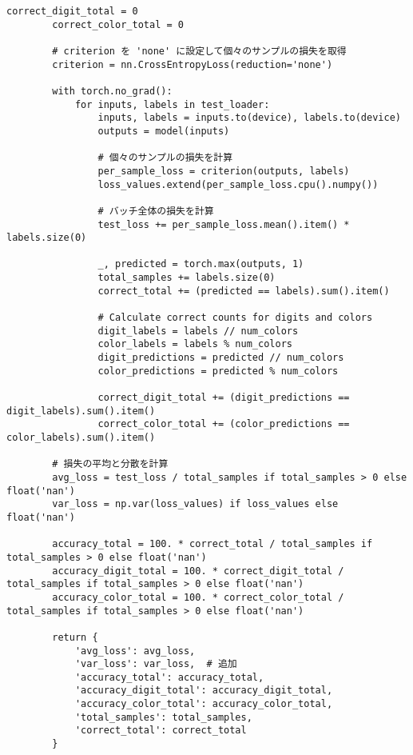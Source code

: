 \begin{lstlisting}[style=pythonstyle, caption={メインコード}]
        correct_digit_total = 0
        correct_color_total = 0
    
        # criterion を 'none' に設定して個々のサンプルの損失を取得
        criterion = nn.CrossEntropyLoss(reduction='none')
    
        with torch.no_grad():
            for inputs, labels in test_loader:
                inputs, labels = inputs.to(device), labels.to(device)
                outputs = model(inputs)
                
                # 個々のサンプルの損失を計算
                per_sample_loss = criterion(outputs, labels)
                loss_values.extend(per_sample_loss.cpu().numpy())
                
                # バッチ全体の損失を計算
                test_loss += per_sample_loss.mean().item() * labels.size(0)
                
                _, predicted = torch.max(outputs, 1)
                total_samples += labels.size(0)
                correct_total += (predicted == labels).sum().item()
    
                # Calculate correct counts for digits and colors
                digit_labels = labels // num_colors
                color_labels = labels % num_colors
                digit_predictions = predicted // num_colors
                color_predictions = predicted % num_colors
    
                correct_digit_total += (digit_predictions == digit_labels).sum().item()
                correct_color_total += (color_predictions == color_labels).sum().item()
    
        # 損失の平均と分散を計算
        avg_loss = test_loss / total_samples if total_samples > 0 else float('nan')
        var_loss = np.var(loss_values) if loss_values else float('nan')
        
        accuracy_total = 100. * correct_total / total_samples if total_samples > 0 else float('nan')
        accuracy_digit_total = 100. * correct_digit_total / total_samples if total_samples > 0 else float('nan')
        accuracy_color_total = 100. * correct_color_total / total_samples if total_samples > 0 else float('nan')
    
        return {
            'avg_loss': avg_loss,
            'var_loss': var_loss,  # 追加
            'accuracy_total': accuracy_total,
            'accuracy_digit_total': accuracy_digit_total,
            'accuracy_color_total': accuracy_color_total,
            'total_samples': total_samples,
            'correct_total': correct_total
        }
        

\end{lstlisting}
